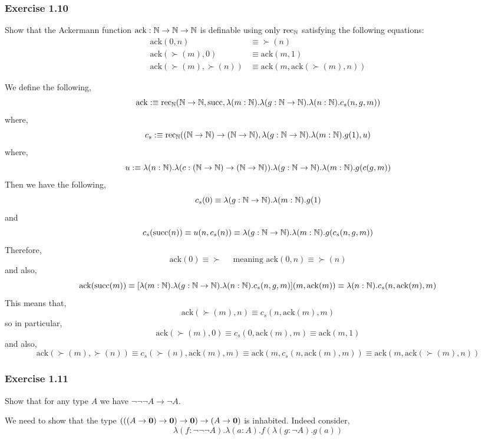 \documentclass[12pt]{article}
\begin{document}
\subsubsection{Exercise 1.10}

\newcommand{\ack}{\mathrm{ack}}

\begin{exercise}
Show that the Ackermann function $\ack : \N \to \N \to \N$ is definable using only $\rec_{\N}$ satisfying the following equations:
\begin{align*}
\ack(0,n) & \equiv \succ(n)
\\
\ack(\succ(m), 0) & \equiv \ack(m, 1)
\\
\ack(\succ(m), \succ(n)) & \equiv \ack(m, \ack(\succ(m), n))
\end{align*}
\end{exercise}

We define the following,
\[ \ack :\equiv \rec_{\N}(\N \to \N, \succ, \lambda (m : \N) . \lambda (g : \N \to \N) . \lambda (n : \N) . c_s(n, g, m)) \]
where,
\[ c_s :\equiv \rec_{\N}((\N \to \N) \to (\N \to \N), \lambda (g : \N \to \N) . \lambda (m : \N) . g(1), u) \]
where,
\[ u :\equiv \lambda (n : \N) . \lambda (c : (\N \to \N) \to (\N \to \N)) . \lambda (g : \N \to \N) . \lambda (m : \N) . g (c(g,m)) \]
Then we have the following,
\[ c_s(0) \equiv \lambda (g : \N \to \N) . \lambda (m : \N) . g(1) \]
and 
\[ c_s(\succ(n)) \equiv u(n, c_s(n)) \equiv \lambda (g : \N \to \N) . \lambda (m : \N) . g(c_s(n, g, m)) \]
Therefore,
\[ \ack(0) \equiv \succ \quad \text{ meaning } \ack(0, n) \equiv \succ(n) \]
and also,
\[ \ack(\succ(m)) \equiv [\lambda (m : \N) . \lambda (g : \N \to \N) . \lambda (n : \N) . c_s(n, g, m)](m, \ack(m)) \equiv \lambda (n : \N) . c_s(n, \ack(m), m) \]
This means that,
\[ \ack(\succ(m), n) \equiv c_s(n, \ack(m), m) \]
so in particular,
\[ \ack(\succ(m), 0) \equiv c_s(0, \ack(m), m) \equiv \ack(m, 1) \]
and also,
\[ \ack(\succ(m), \succ(n)) \equiv c_s(\succ(n), \ack(m), m) \equiv \ack(m, c_s(n, \ack(m), m)) \equiv \ack(m, \ack(\succ(m), n)) \]


\subsubsection{Exercise 1.11}

\begin{exercise}
Show that for any type $A$ we have $\neg \neg \neg A \to \neg A$. 
\end{exercise}

We need to show that the type $(((A \to \bf{0}) \to \bf{0}) \to \bf{0}) \to (A \to \bf{0})$ is inhabited. Indeed consider,
\[ \lambda (f : \neg \neg \neg A) . \lambda (a : A) . f( \lambda (g : \neg A) . g(a) ) \]
\end{document}

